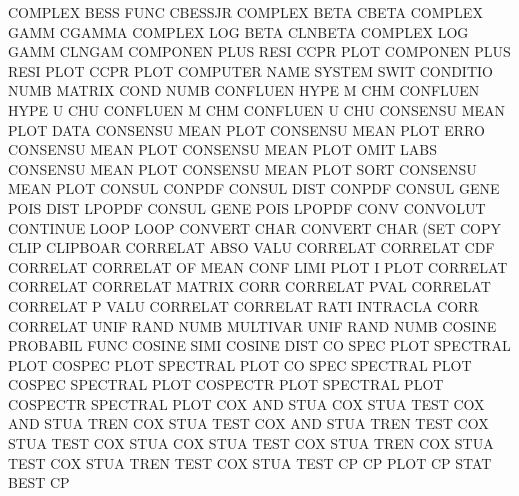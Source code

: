 COMPLEX  BESS FUNC                      CBESSJR
COMPLEX  BETA                           CBETA
COMPLEX  GAMM                           CGAMMA
COMPLEX  LOG BETA                       CLNBETA
COMPLEX  LOG GAMM                       CLNGAM
COMPONEN PLUS RESI                      CCPR     PLOT
COMPONEN PLUS RESI PLOT                 CCPR     PLOT
COMPUTER NAME                           SYSTEM   SWIT
CONDITIO NUMB                           MATRIX   COND NUMB
CONFLUEN HYPE M                         CHM
CONFLUEN HYPE U                         CHU
CONFLUEN M                              CHM
CONFLUEN U                              CHU
CONSENSU MEAN PLOT DATA                 CONSENSU MEAN PLOT
CONSENSU MEAN PLOT ERRO                 CONSENSU MEAN PLOT
CONSENSU MEAN PLOT OMIT LABS            CONSENSU MEAN PLOT
CONSENSU MEAN PLOT SORT                 CONSENSU MEAN PLOT
CONSUL                                  CONPDF
CONSUL   DIST                           CONPDF
CONSUL   GENE POIS DIST                 LPOPDF
CONSUL   GENE POIS                      LPOPDF
CONV                                    CONVOLUT
CONTINUE LOOP                           LOOP
CONVERT  CHAR                           CONVERT  CHAR (SET
COPY     CLIP                           CLIPBOAR
CORRELAT ABSO VALU                      CORRELAT
CORRELAT CDF                            CORRELAT
CORRELAT OF   MEAN CONF LIMI PLOT       I        PLOT
CORRELAT                                CORRELAT
CORRELAT                                MATRIX   CORR
CORRELAT PVAL                           CORRELAT
CORRELAT P    VALU                      CORRELAT
CORRELAT RATI                           INTRACLA CORR
CORRELAT UNIF RAND NUMB                 MULTIVAR UNIF RAND NUMB
COSINE                                  PROBABIL FUNC
COSINE   SIMI                           COSINE   DIST
CO       SPEC PLOT                      SPECTRAL PLOT
COSPEC   PLOT                           SPECTRAL PLOT
CO       SPEC                           SPECTRAL PLOT
COSPEC                                  SPECTRAL PLOT
COSPECTR PLOT                           SPECTRAL PLOT
COSPECTR                                SPECTRAL PLOT
COX      AND  STUA                      COX      STUA TEST
COX      AND  STUA TREN                 COX      STUA TEST
COX      AND  STUA TREN TEST            COX      STUA TEST
COX      STUA                           COX      STUA TEST
COX      STUA TREN                      COX      STUA TEST
COX      STUA TREN TEST                 COX      STUA TEST
CP                                      CP       PLOT
CP       STAT                           BEST     CP
